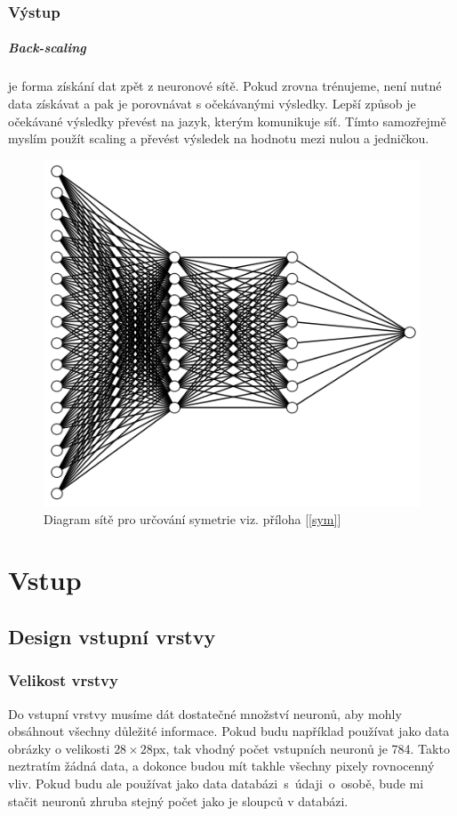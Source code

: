 \documentclass[12pt,a4paper]{report}
\begin{document}
	\subsection{Výstup}
		\paragraph{Back-scaling}
		je forma získání dat zpět z neuronové sítě. Pokud zrovna trénujeme, není nutné data získávat a pak je porovnávat s očekávanými výsledky. Lepší způsob je očekávané výsledky převést na jazyk, kterým komunikuje síť. Tímto samozřejmě myslím použít scaling a převést výsledek na hodnotu mezi nulou a jedničkou.
	\begin{figure}[h]
		\centering
		\includegraphics[width=15cm]{images/nn16-8-8-1}
		\caption{Diagram sítě pro určování symetrie viz. příloha [\ref{sym}]}
	\end{figure}
\chapter{Vstup}
	\section{Design vstupní vrstvy}
		\subsection{Velikost vrstvy}
		Do vstupní vrstvy musíme dát dostatečné množství neuronů, aby mohly obsáhnout všechny důležité informace. Pokud budu například používat jako data obrázky o velikosti $28\times 28$px, tak vhodný počet vstupních neuronů je 784. Takto neztratím žádná data, a dokonce budou mít takhle všechny pixely rovnocenný vliv. Pokud budu ale používat jako data databázi~s~údaji~o~osobě, bude mi stačit neuronů zhruba stejný počet jako je sloupců v databázi.
\end{document}

